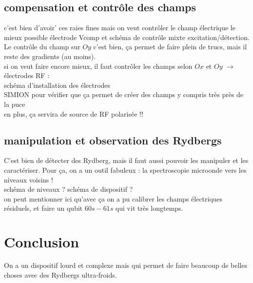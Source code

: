 	\subsection{compensation et contrôle des champs}
	c'est bien d'avoir' ces raies fines mais on veut contrôler le champ électrique le mieux possible
		\noindent électrode Vcomp et schéma de contrôle mixte excitation/détection. Le contrôle du champ sur $Oy$ c'est bien, ça permet de faire plein de trucs, mais il reste des gradients (au moins).\\
		
		\noindent si on veut faire encore mieux, il faut contrôler les champs selon $Ox$ et $Oy$ $\rightarrow$ électrodes RF :
		\\ schéma d'installation des électrodes
		\\ SIMION pour vérifier que ça permet de créer des champs y compris très près de la puce
		\\ en plus, ça servira de source de RF polarisée !!
		
	\subsection{manipulation et observation des Rydbergs}
\noindent C'est bien de détecter des Rydberg, mais il faut aussi pouvoir les manipuler et les caractériser.
Pour ça, on a un outil fabuleux : la spectroscopie microonde vers les niveaux voisins ! \\
schéma de niveaux ? schéma de dispositif ? \\
on peut mentionner ici qu'avec ça on a pu calibrer les champs électriques résiduels, et faire un qubit $60s-61s$ qui vit très longtemps.

\section*{Conclusion}
On a un dispositif lourd et complexe mais qui permet de faire beaucoup de belles choses avec des Rydbergs ultra-froids.